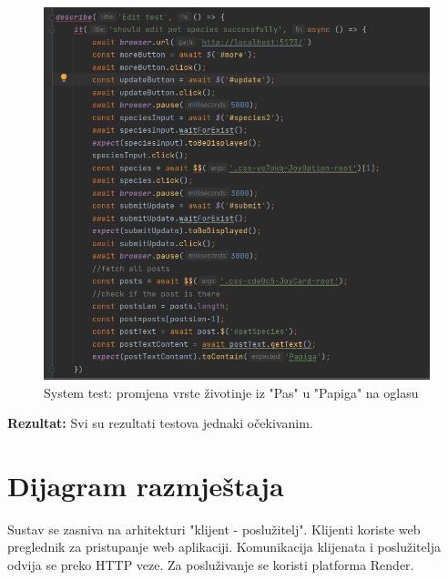 			\begin{figure}[H]
				\includegraphics[scale=0.7]{slike/sysedit1.PNG} 
				\centering
				\caption{System test: promjena vrste životinje iz "Pas" u "Papiga" na oglasu}
				\label{sysedit1}
			\end{figure}
			
			\textbf{Rezultat:}
			Svi su rezultati testova jednaki očekivanim.\\
			
			\eject 
		
		
		\section{Dijagram razmještaja}
			
			Sustav se zasniva na arhitekturi "klijent - poslužitelj". Klijenti koriste web preglednik za pristupanje web aplikaciji. Komunikacija klijenata i poslužitelja odvija se preko HTTP veze. Za posluživanje se koristi platforma Render.
			 
